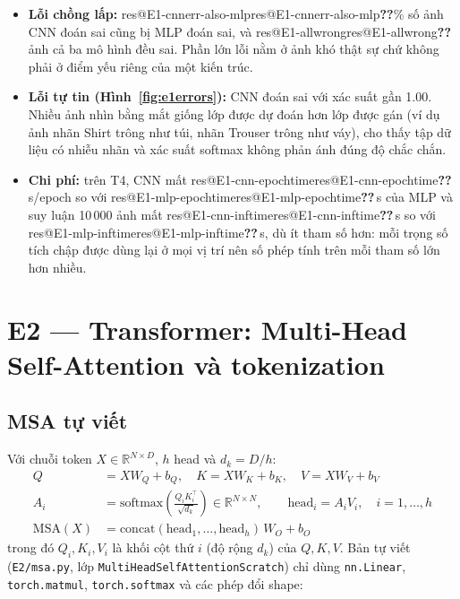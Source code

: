 \documentclass[twoside,final]{hcmut-report}
\makeatletter
\newcommand{\res}[1]{\ifcsname res@#1\endcsname\csname res@#1\endcsname\else\textbf{??}\fi}
\makeatother
\begin{document}
\begin{itemize}
        $\rightarrow$ \res{E1-toppair-pred} (\res{E1-toppair-count} ảnh với CNN). Tỉ lệ lỗi nằm trong nhóm áo thân
        trên (T-shirt/top, Pullover, Coat, Shirt) tăng dần \res{E1-softmax-upperbody-share}\% $\rightarrow$
        \res{E1-mlp-upperbody-share}\% $\rightarrow$ \res{E1-cnn-upperbody-share}\%: mô hình càng tốt thì lỗi còn
        lại càng dồn vào nhóm vốn mơ hồ ở độ phân giải $28\times28$.
  \item \textbf{Lỗi chồng lấp:} \res{E1-cnnerr-also-mlp}\% số ảnh CNN đoán sai cũng bị MLP đoán sai, và
        \res{E1-allwrong} ảnh cả ba mô hình đều sai. Phần lớn lỗi nằm ở ảnh khó thật sự chứ không phải ở điểm
        yếu riêng của một kiến trúc.
  \item \textbf{Lỗi tự tin (Hình~\ref{fig:e1errors}):} CNN đoán sai với xác suất gần 1.00. Nhiều ảnh nhìn bằng
        mắt giống lớp được dự đoán hơn lớp được gán (ví dụ ảnh nhãn Shirt trông như túi, nhãn Trouser trông như
        váy), cho thấy tập dữ liệu có nhiễu nhãn và xác suất softmax không phản ánh đúng độ chắc chắn.
  \item \textbf{Chi phí:} trên T4, CNN mất \res{E1-cnn-epochtime}\,s/epoch so với \res{E1-mlp-epochtime}\,s của
        MLP và suy luận 10\,000 ảnh mất \res{E1-cnn-inftime}\,s so với \res{E1-mlp-inftime}\,s, dù ít tham số
        hơn: mỗi trọng số tích chập được dùng lại ở mọi vị trí nên số phép tính trên mỗi tham số lớn hơn nhiều.
\end{itemize}

\section{E2 — Transformer: Multi-Head Self-Attention và tokenization}

\subsection{MSA tự viết}
Với chuỗi token $X\in\mathbb{R}^{N\times D}$, $h$ head và $d_k=D/h$:
\begin{align*}
Q &= XW_Q+b_Q,\quad K = XW_K+b_K,\quad V = XW_V+b_V \\
A_i &= \mathrm{softmax}\!\left(\frac{Q_iK_i^\top}{\sqrt{d_k}}\right)\in\mathbb{R}^{N\times N},\qquad
\mathrm{head}_i = A_iV_i,\quad i=1,\dots,h \\
\mathrm{MSA}(X) &= \mathrm{concat}(\mathrm{head}_1,\dots,\mathrm{head}_h)\,W_O + b_O
\end{align*}
trong đó $Q_i,K_i,V_i$ là khối cột thứ $i$ (độ rộng $d_k$) của $Q,K,V$. Bản tự viết
(\texttt{E2/msa.py}, lớp \texttt{MultiHeadSelfAttentionScratch}) chỉ dùng \texttt{nn.Linear},
\texttt{torch.matmul}, \texttt{torch.softmax} và các phép đổi shape:
\end{document}
